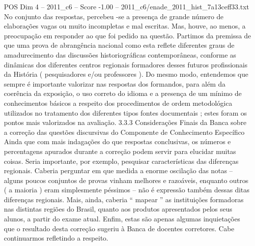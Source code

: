 \begin{textsample}{POS Dim 4 – 2011\_c6 – Score -1.00 – 2011\_c6/enade\_2011\_hist\_7a13ceff33.txt}
No conjunto das respostas, percebeu -se a presença de grande número de elaborações vagas ou muito incompletas e mal escritas.
Mas, houve, ao menos, a preocupação em responder ao que foi pedido na questão.
Partimos da premissa de que uma prova de abrangência nacional como esta reflete diferentes graus de amadurecimento das discussões historiográficas contemporâneas, conforme as dinâmicas dos diferentes centros regionais formadores desses futuros profissionais da História ( pesquisadores e/ou professores ).
Do mesmo modo, entendemos que sempre é importante valorizar nas respostas dos formandos, para além da coerência da exposição, o uso correto do idioma e a presença de um mínimo de conhecimentos básicos a respeito dos procedimentos de ordem metodológica utilizados no tratamento dos diferentes tipos fontes documentais ; estes foram os pontos mais valorizados na avaliação. 3.3.3 Considerações Finais da Banca sobre a correção das questões discursivas do Componente de Conhecimento Específico Ainda que com mais indagações do que respostas conclusivas, os números e percentagens apurados durante a correção podem servir para elucidar muitas coisas.
Seria importante, por exemplo, pesquisar características das diferenças regionais.
Caberia perguntar em que medida a enorme oscilação das notas – alguns poucos conjuntos de provas vinham melhores e razoáveis, enquanto outros ( a maioria ) eram simplesmente péssimos – não é expressão também dessas ditas diferenças regionais.
Mais, ainda, caberia “ mapear ” as instituições formadoras nas distintas regiões do Brasil, quanto aos produtos apresentados pelos seus alunos, a partir do exame atual.
Enfim, estas são apenas algumas inquietações que o resultado desta correção sugeriu à Banca de docentes corretores.
Cabe continuarmos refletindo a respeito.

\end{textsample}
